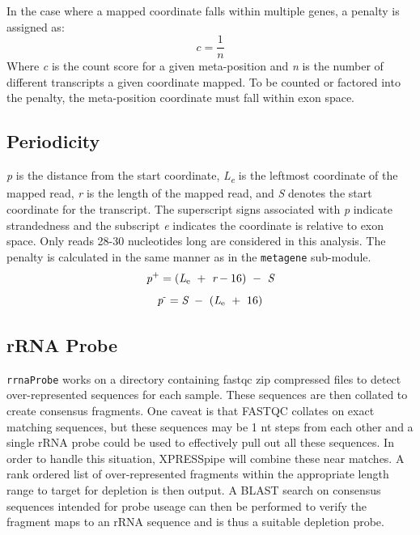 \documentclass[11pt, a4paper, oneside]{article}
\begin{document}
In the case where a mapped coordinate falls within multiple genes, a penalty is assigned as:
\begin{equation}
  \textit{c} = \frac{1}{\textit{n}}
\end{equation}
Where \textit{c} is the count score for a given meta-position and \textit{n} is the number of different transcripts a given coordinate mapped. To be counted or factored into the penalty, the meta-position coordinate must fall within exon space.

\subsection{Periodicity}
\textit{p} is the distance from the start coordinate, \textit{L\textsubscript{e}} is the leftmost coordinate of the mapped read, \textit{r} is the length of the mapped read, and \textit{S} denotes the start coordinate for the transcript. The superscript signs associated with \textit{p} indicate strandedness and the subscript \textit{e} indicates the coordinate is relative to exon space. Only reads 28-30 nucleotides long are considered in this analysis. The penalty is calculated in the same manner as in the \texttt{metagene} sub-module.
\begin{equation}
  \textit{p}\textsuperscript{+} = (\textit{L}\textsubscript{e}\ +\ \textit{r} - 16)\ -\ \textit{S}
\end{equation}
\begin{equation}
  \textit{p}\textsuperscript{-} = \textit{S}\ -\ (\textit{L}\textsubscript{e}\ +\ 16)
\end{equation}

\subsection{rRNA Probe}
\texttt{rrnaProbe} works on a directory containing fastqc \cite{fastqc} zip compressed files to detect over-represented sequences for each sample. These sequences are then collated to create consensus fragments. One caveat is that FASTQC collates on exact matching sequences, but these sequences may be 1 nt steps from each other and a single rRNA probe could be used to effectively pull out all these sequences. In order to handle this situation, XPRESSpipe will combine these near matches. A rank ordered list of over-represented fragments within the appropriate length range to target for depletion is then output. A BLAST \cite{blast} search on consensus sequences intended for probe useage can then be performed to verify the fragment maps to an rRNA sequence and is thus a suitable depletion probe.
\end{document}
